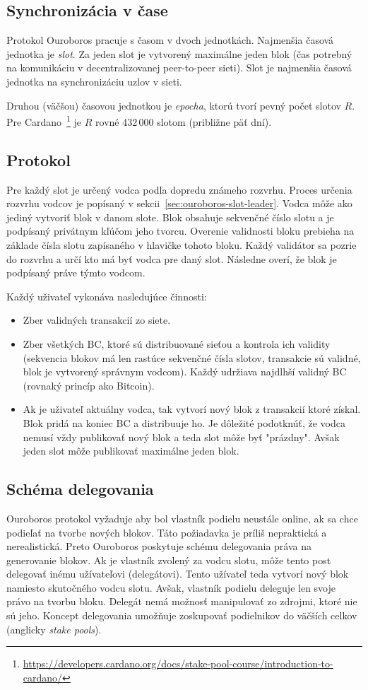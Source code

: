 \subsection{Synchronizácia v čase}
Protokol Ouroboros pracuje s časom v dvoch jednotkách. Najmenšia časová jednotka je \textit{slot}. Za jeden slot je vytvorený maximálne jeden blok (čas potrebný na komunikáciu v decentralizovanej peer-to-peer sieti). Slot je najmenšia časová jednotka na synchronizáciu uzlov v sieti. 

Druhou (väčšou) časovou jednotkou je \textit{epocha}, ktorú tvorí pevný počet slotov $R$. Pre Cardano~\footnote{\url{https://developers.cardano.org/docs/stake-pool-course/introduction-to-cardano/}} je $R$ rovné 432\,000 slotom (približne päť dní).

\subsection{Protokol}\label{subsec:ouroboros-protocol}
Pre každý slot je určený vodca podľa dopredu známeho rozvrhu. Proces určenia rozvrhu vodcov je popísaný v sekcii~\ref{sec:ouroboros-slot-leader}. Vodca môže ako jediný vytvoriť blok v danom slote. 
Blok obsahuje sekvenčné číslo slotu a je podpísaný privátnym kľúčom jeho tvorcu. Overenie validnosti bloku prebieha na základe čísla slotu zapísaného v hlavičke tohoto bloku. Každý validátor sa pozrie do rozvrhu a určí kto má byť vodca pre daný slot. Následne overí, že blok je podpísaný práve týmto vodcom.

Každý uživateľ vykonáva nasledujúce činnosti:
\begin{itemize}
	\item Zber validných transakcií zo siete.
	\item Zber všetkých BC, ktoré sú distribuované sieťou a kontrola ich validity (sekvencia blokov má len rastúce sekvenčné čísla slotov, transakcie sú validné, blok je vytvorený správnym vodcom). Každý udržiava najdlhší validný BC (rovnaký princíp ako Bitcoin).
	\item Ak je uživateľ aktuálny vodca, tak vytvorí nový blok z transakcií ktoré získal. Blok pridá na koniec BC a distribuuje ho. Je dôležité podotknúť, že vodca nemusí vždy publikovať nový blok a teda slot môže byť "prázdny". Avšak jeden slot môže publikovať maximálne jeden blok.
\end{itemize}

\subsection{Schéma delegovania}\label{subsec:ourobors-delegation}
Ouroboros protokol vyžaduje aby bol vlastník podielu neustále online, ak sa chce podieľať na tvorbe nových blokov. Táto požiadavka je príliš nepraktická a nerealistická. Preto Ouroboros poskytuje schému delegovania práva na generovanie blokov. Ak je vlastník zvolený za vodcu slotu, môže tento post delegovať inému užívateľovi (delegátovi). Tento užívateľ teda vytvorí nový blok namiesto skutočného vodcu slotu. Avšak, vlastník podielu deleguje len svoje právo na tvorbu bloku. Delegát nemá možnosť manipulovať zo zdrojmi, ktoré nie sú jeho. Koncept delegovania umožňuje zoskupovať podielnikov do väčších celkov (anglicky \textit{stake pools}). 

